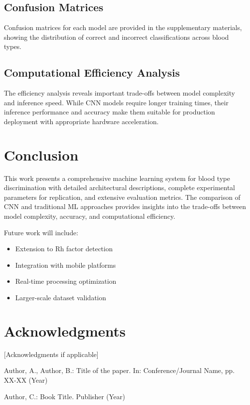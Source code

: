 \documentclass[runningheads]{llncs}
\begin{document}
\subsection{Confusion Matrices}

Confusion matrices for each model are provided in the supplementary materials, showing the distribution of correct and incorrect classifications across blood types.

\subsection{Computational Efficiency Analysis}

The efficiency analysis reveals important trade-offs between model complexity and inference speed. While CNN models require longer training times, their inference performance and accuracy make them suitable for production deployment with appropriate hardware acceleration.

\section{Conclusion}

This work presents a comprehensive machine learning system for blood type discrimination with detailed architectural descriptions, complete experimental parameters for replication, and extensive evaluation metrics. The comparison of CNN and traditional ML approaches provides insights into the trade-offs between model complexity, accuracy, and computational efficiency.

Future work will include:
\begin{itemize}
    \item Extension to Rh factor detection
    \item Integration with mobile platforms
    \item Real-time processing optimization
    \item Larger-scale dataset validation
\end{itemize}

\section*{Acknowledgments}

[Acknowledgments if applicable]

\begin{thebibliography}{99}

Author, A., Author, B.: Title of the paper. In: Conference/Journal Name, pp. XX-XX (Year)

Author, C.: Book Title. Publisher (Year)

\end{thebibliography}
\end{document}
